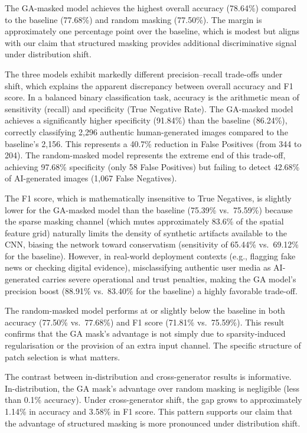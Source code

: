 \documentclass[runningheads]{llncs}
\begin{document}
The GA-masked model achieves the highest overall accuracy (78.64\%) compared to the baseline (77.68\%) and random masking (77.50\%). The margin is approximately one percentage point over the baseline, which is modest but aligns with our claim that structured masking provides additional discriminative signal under distribution shift.

The three models exhibit markedly different precision--recall trade-offs under shift, which explains the apparent discrepancy between overall accuracy and F1 score. In a balanced binary classification task, accuracy is the arithmetic mean of sensitivity (recall) and specificity (True Negative Rate). The GA-masked model achieves a significantly higher specificity (91.84\%) than the baseline (86.24\%), correctly classifying 2,296 authentic human-generated images compared to the baseline's 2,156. This represents a 40.7\% reduction in False Positives (from 344 to 204). The random-masked model represents the extreme end of this trade-off, achieving 97.68\% specificity (only 58 False Positives) but failing to detect 42.68\% of AI-generated images (1,067 False Negatives). 

The F1 score, which is mathematically insensitive to True Negatives, is slightly lower for the GA-masked model than the baseline (75.39\% vs.\ 75.59\%) because the sparse masking channel (which mutes approximately 83.6\% of the spatial feature grid) naturally limits the density of synthetic artifacts available to the CNN, biasing the network toward conservatism (sensitivity of 65.44\% vs.\ 69.12\% for the baseline). However, in real-world deployment contexts (e.g., flagging fake news or checking digital evidence), misclassifying authentic user media as AI-generated carries severe operational and trust penalties, making the GA model's precision boost (88.91\% vs.\ 83.40\% for the baseline) a highly favorable trade-off.

The random-masked model performs at or slightly below the baseline in both accuracy (77.50\% vs.\ 77.68\%) and F1 score (71.81\% vs.\ 75.59\%). This result confirms that the GA mask's advantage is not simply due to sparsity-induced regularisation or the provision of an extra input channel. The specific structure of patch selection is what matters.

The contrast between in-distribution and cross-generator results is informative. In-distribution, the GA mask's advantage over random masking is negligible (less than 0.1\% accuracy). Under cross-generator shift, the gap grows to approximately 1.14\% in accuracy and 3.58\% in F1 score. This pattern supports our claim that the advantage of structured masking is more pronounced under distribution shift.
\end{document}
